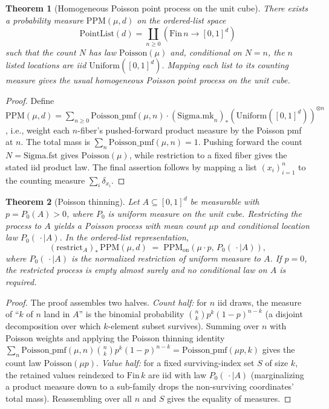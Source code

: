 \documentclass[pdflatex]{sn-jnl}
\theoremstyle{thmstyleone}
\newtheorem{theorem}{Theorem}[section]
\theoremstyle{thmstyletwo}
\theoremstyle{thmstylethree}
\begin{document}
\begin{theorem}[Homogeneous Poisson point process on the unit cube]\label{thm:poisson-process}
There exists a probability measure $\mathrm{PPM}(\mu,d)$ on the ordered-list space
\[
  \mathrm{PointList}(d)=\coprod_{n\ge0}(\mathrm{Fin}\,n\to[0,1]^d)
\]
such that the count $N$ has law $\mathrm{Poisson}(\mu)$ and, conditional on $N=n$, the $n$ listed locations are iid $\mathrm{Uniform}([0,1]^d)$. Mapping each list to its counting measure gives the usual homogeneous Poisson point process on the unit cube.
\end{theorem}

\begin{proof}
Define $\mathrm{PPM}(\mu,d) = \sum_{n\ge 0}\mathrm{Poisson\_pmf}(\mu,n)\cdot(\mathrm{Sigma.mk}_n)_*(\mathrm{Uniform}([0,1]^d))^{\otimes n}$, i.e., weight each $n$-fiber's pushed-forward product measure by the Poisson pmf at $n$. The total mass is $\sum_n\mathrm{Poisson\_pmf}(\mu,n) = 1$. Pushing forward the count $N = \mathrm{Sigma.fst}$ gives $\mathrm{Poisson}(\mu)$, while restriction to a fixed fiber gives the stated iid product law. The final assertion follows by mapping a list $(x_i)_{i=1}^n$ to the counting measure $\sum_i\delta_{x_i}$.
\end{proof}

\begin{theorem}[Poisson thinning]\label{thm:thinning}
Let $A\subseteq[0,1]^d$ be measurable with $p=P_0(A)>0$, where $P_0$ is uniform measure on the unit cube. Restricting the process to $A$ yields a Poisson process with mean count $\mu p$ and conditional location law $P_0(\,\cdot\mid A)$. In the ordered-list representation,
\[
  (\mathrm{restrict}_A)_*\,\mathrm{PPM}(\mu,d) \;=\; \mathrm{PPM}_{\mathrm{on}}(\mu\cdot p,\,P_0(\,\cdot\mid A)),
\]
where $P_0(\,\cdot\mid A)$ is the normalized restriction of uniform measure to $A$. If $p=0$, the restricted process is empty almost surely and no conditional law on $A$ is required.
\end{theorem}

\begin{proof}
The proof assembles two halves. \emph{Count half:} for $n$ iid draws, the measure of ``$k$ of $n$ land in $A$'' is the binomial probability $\binom{n}{k}p^k(1-p)^{n-k}$ (a disjoint decomposition over which $k$-element subset survives). Summing over $n$ with Poisson weights and applying the Poisson thinning identity $\sum_n\mathrm{Poisson\_pmf}(\mu,n)\binom{n}{k}p^k(1-p)^{n-k} = \mathrm{Poisson\_pmf}(\mu p, k)$ gives the count law $\mathrm{Poisson}(\mu p)$. \emph{Value half:} for a fixed surviving-index set $S$ of size $k$, the retained values reindexed to $\mathrm{Fin}\,k$ are iid with law $P_0(\,\cdot\mid A)$ (marginalizing a product measure down to a sub-family drops the non-surviving coordinates' total mass). Reassembling over all $n$ and $S$ gives the equality of measures.
\end{proof}
\end{document}
